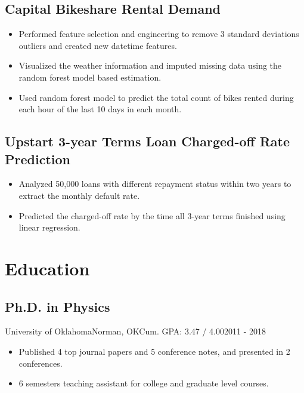 \documentclass[11pt, letterpaper]{yt_resume}   	%
\begin{document}
\subsection{Capital Bikeshare Rental Demand}{}{}{}{}
\begin{itemize}
\item Performed feature selection and engineering to remove 3 standard deviations outliers and created new datetime features.
\item Visualized the weather information and imputed missing data using the random forest model based estimation.
\item Used random forest model to predict the total count of bikes rented during each hour of the last 10 days in each month.
\end{itemize}

\subsection{Upstart 3-year Terms Loan Charged-off Rate Prediction}{}{}{}{}
\begin{itemize}
\item Analyzed 50,000 loans with different repayment status within two years to extract the monthly default rate.
\item Predicted the charged-off rate by the time all 3-year terms finished using linear regression.
\end{itemize}



\section{Education}

\subsection{Ph.D. in Physics}{University of Oklahoma}{Norman, OK}{Cum. GPA: 3.47 / 4.00}{2011 - 2018}
\begin{itemize}
\item Published 4 top journal papers and 5 conference notes, and presented in 2 conferences.
\item 6 semesters teaching assistant for college and graduate level courses.
\end{itemize}
\end{document}

